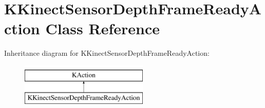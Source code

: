 \hypertarget{class_k_kinect_sensor_depth_frame_ready_action}{\section{\-K\-Kinect\-Sensor\-Depth\-Frame\-Ready\-Action \-Class \-Reference}
\label{class_k_kinect_sensor_depth_frame_ready_action}
}
\-Inheritance diagram for \-K\-Kinect\-Sensor\-Depth\-Frame\-Ready\-Action\-:\begin{figure}[H]
\begin{center}
\leavevmode
\includegraphics[height=2.000000cm]{class_k_kinect_sensor_depth_frame_ready_action}
\end{center}
\end{figure}
